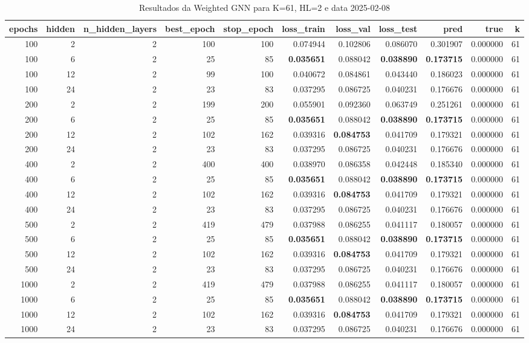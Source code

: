\begin{table}
\caption{Resultados da Weighted GNN para K=61, HL=2 e data 2025-02-08}
\label{tab:weighted_gnn_results_k61_hl2_d20250208}
\begin{tabular}{rrrrrrrrrrr}
\toprule
epochs & hidden & n\_hidden\_layers & best\_epoch & stop\_epoch & loss\_train & loss\_val & loss\_test & pred & true & k \\
\midrule
100 & 2 & 2 & 100 & 100 & 0.074944 & 0.102806 & 0.086070 & 0.301907 & 0.000000 & 61 \\
100 & 6 & 2 & 25 & 85 & \textbf{0.035651} & 0.088042 & \textbf{0.038890} & \textbf{0.173715} & 0.000000 & 61 \\
100 & 12 & 2 & 99 & 100 & 0.040672 & 0.084861 & 0.043440 & 0.186023 & 0.000000 & 61 \\
100 & 24 & 2 & 23 & 83 & 0.037295 & 0.086725 & 0.040231 & 0.176676 & 0.000000 & 61 \\
200 & 2 & 2 & 199 & 200 & 0.055901 & 0.092360 & 0.063749 & 0.251261 & 0.000000 & 61 \\
200 & 6 & 2 & 25 & 85 & \textbf{0.035651} & 0.088042 & \textbf{0.038890} & \textbf{0.173715} & 0.000000 & 61 \\
200 & 12 & 2 & 102 & 162 & 0.039316 & \textbf{0.084753} & 0.041709 & 0.179321 & 0.000000 & 61 \\
200 & 24 & 2 & 23 & 83 & 0.037295 & 0.086725 & 0.040231 & 0.176676 & 0.000000 & 61 \\
400 & 2 & 2 & 400 & 400 & 0.038970 & 0.086358 & 0.042448 & 0.185340 & 0.000000 & 61 \\
400 & 6 & 2 & 25 & 85 & \textbf{0.035651} & 0.088042 & \textbf{0.038890} & \textbf{0.173715} & 0.000000 & 61 \\
400 & 12 & 2 & 102 & 162 & 0.039316 & \textbf{0.084753} & 0.041709 & 0.179321 & 0.000000 & 61 \\
400 & 24 & 2 & 23 & 83 & 0.037295 & 0.086725 & 0.040231 & 0.176676 & 0.000000 & 61 \\
500 & 2 & 2 & 419 & 479 & 0.037988 & 0.086255 & 0.041117 & 0.180057 & 0.000000 & 61 \\
500 & 6 & 2 & 25 & 85 & \textbf{0.035651} & 0.088042 & \textbf{0.038890} & \textbf{0.173715} & 0.000000 & 61 \\
500 & 12 & 2 & 102 & 162 & 0.039316 & \textbf{0.084753} & 0.041709 & 0.179321 & 0.000000 & 61 \\
500 & 24 & 2 & 23 & 83 & 0.037295 & 0.086725 & 0.040231 & 0.176676 & 0.000000 & 61 \\
1000 & 2 & 2 & 419 & 479 & 0.037988 & 0.086255 & 0.041117 & 0.180057 & 0.000000 & 61 \\
1000 & 6 & 2 & 25 & 85 & \textbf{0.035651} & 0.088042 & \textbf{0.038890} & \textbf{0.173715} & 0.000000 & 61 \\
1000 & 12 & 2 & 102 & 162 & 0.039316 & \textbf{0.084753} & 0.041709 & 0.179321 & 0.000000 & 61 \\
1000 & 24 & 2 & 23 & 83 & 0.037295 & 0.086725 & 0.040231 & 0.176676 & 0.000000 & 61 \\
\bottomrule
\end{tabular}
\end{table}

